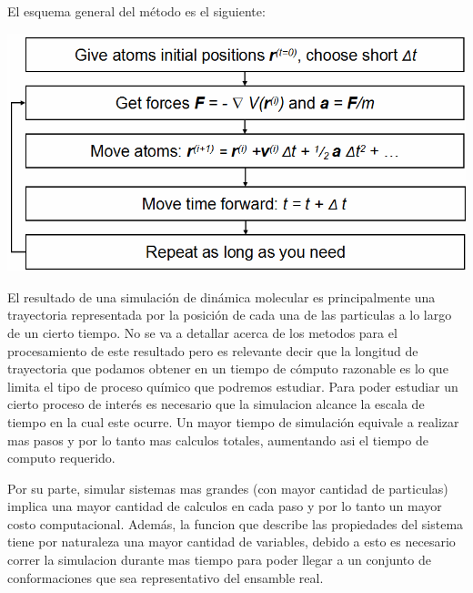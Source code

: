\documentclass[a4paper,10pt]{report}
\begin{document}
El esquema general del método es el siguiente:


\includegraphics[keepaspectratio, width=\textwidth]{img/mdalgorithm.png}


\vspace{20pt}



  



El resultado de una simulación de dinámica molecular es principalmente una trayectoria representada por la posición de cada una de las particulas a lo largo de un cierto tiempo.
No se va a detallar acerca de los metodos para el procesamiento de este resultado pero es relevante decir que la longitud de trayectoria que podamos obtener en un tiempo de cómputo razonable es lo que limita el tipo de proceso químico que podremos estudiar.
Para poder estudiar un cierto proceso de interés es necesario que la simulacion alcance la escala de tiempo en la cual este ocurre. Un mayor tiempo de simulación equivale a realizar mas pasos y por lo tanto mas calculos totales, aumentando asi el tiempo de computo requerido.

Por su parte, simular sistemas mas grandes (con mayor cantidad de particulas) implica una mayor cantidad de calculos en cada paso y por lo tanto un mayor costo computacional. Además, la funcion que describe las propiedades del sistema tiene por naturaleza una mayor cantidad de variables, debido a esto es necesario  correr la simulacion durante mas tiempo para poder llegar a un conjunto de conformaciones que sea representativo del ensamble real.
\end{document}
